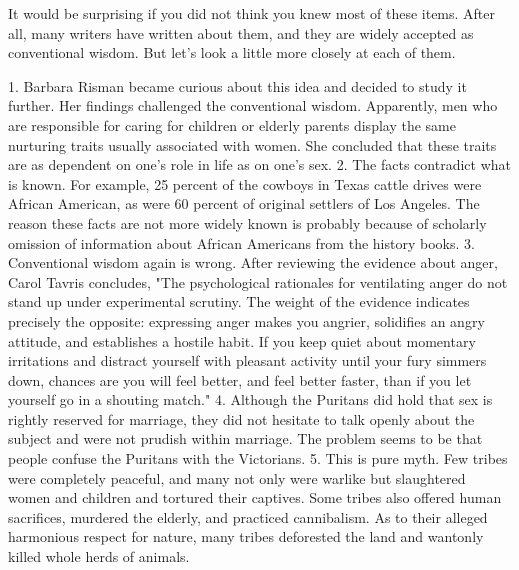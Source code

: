 \documentclass{book}
\begin{document}
It would be surprising if you did not think you knew most of these items. After all, many writers have written about them, and they are widely accepted as conventional wisdom. But let’s look a little more closely at each of them.

1. Barbara Risman became curious about this idea and decided to study it further. Her findings challenged the conventional wisdom. Apparently, men who are responsible for caring for children or elderly parents display the same nurturing traits usually associated with women. She concluded that these traits are as dependent on one’s role in life as on one’s sex.
2. The facts contradict what is known. For example, 25 percent of the cowboys in Texas cattle drives were African American, as were 60 percent of original settlers of Los Angeles. The reason these facts are not more widely known is probably because of scholarly omission of information about African Americans from the history books.
3. Conventional wisdom again is wrong. After reviewing the evidence about anger, Carol Tavris concludes, "The psychological rationales for ventilating anger do not stand up under experimental scrutiny. The weight of the evidence indicates precisely the opposite: expressing anger makes you angrier, solidifies an angry attitude, and establishes a hostile habit. If you keep quiet about momentary irritations and distract yourself with pleasant activity until your fury simmers down, chances are you will feel better, and feel better faster, than if you let yourself go in a shouting match."
4. Although the Puritans did hold that sex is rightly reserved for marriage, they did not hesitate to talk openly about the subject and were not prudish within marriage. The problem seems to be that people confuse the Puritans with the Victorians.
5. This is pure myth. Few tribes were completely peaceful, and many not only were warlike but slaughtered women and children and tortured their captives. Some tribes also offered human sacrifices, murdered the elderly, and practiced cannibalism. As to their alleged harmonious respect for nature, many tribes deforested the land and wantonly killed whole herds of animals.
\end{document}

